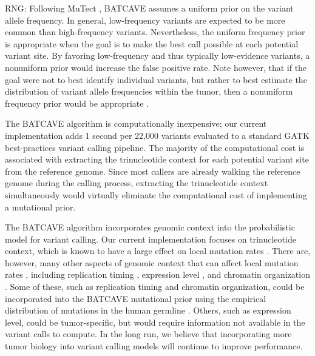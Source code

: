 \documentclass[a4,center,fleqn]{NAR}
\newcommand{\rngcomment}[1]{{\color{red}RNG: #1}}
\newcommand{\batcave}{BATCAVE\xspace}
\begin{document}
\rngcomment{
Following MuTect \cite{Cibulskis2013}, \batcave assumes a uniform prior on the variant allele frequency.
In general, low-frequency variants are expected to be more common than high-frequency variants.
Nevertheless, the uniform frequency prior is appropriate when the goal is to make the best call possible at each potential variant site.
By favoring low-frequency and thus typically low-evidence variants, a nonuniform prior would increase the false positive rate.
Note however, that if the goal were not to best identify individual variants, but rather to best estimate the distribution of variant allele frequencies within the tumor, then a nonuniform frequency prior would be appropriate \cite{Nielsen2012}.
}

The \batcave algorithm is computationally inexpensive; our current implementation adds 1 second per 22,000 variants evaluated to a standard GATK best-practices variant calling pipeline.
The majority of the computational cost is associated with extracting the trinucleotide context for each potential variant site from the reference genome.
Since most callers are already walking the reference genome during the calling process, extracting the trinucleotide context simultaneously would virtually eliminate the computational cost of implementing a mutational prior.

The \batcave algorithm incorporates genomic context into the probabilistic model for variant calling.
Our current implementation focuses on trinucleotide context, which is known to have a large effect on local mutation rates \cite{Martincorena2015,Hollstein2017}.
There are, however, many other aspects of genomic context that can affect local mutation rates \cite{Buisson2019}, including replication timing \cite{Stamatoyannopoulos2009}, expression level \cite{Pleasance2010}, and chromatin organization \cite{Schuster-Bockler2012}. 
Some of these, such as replication timing and chromatin organization, could be incorporated into the \batcave mutational prior using the empirical distribution of mutations in the human germline \cite{Hodgkinson2011}.
Others, such as expression level, could be tumor-specific, but would require information not available in the variant calls to compute.
In the long run, we believe that incorporating more tumor biology into variant calling models will continue to improve performance.
\end{document}
